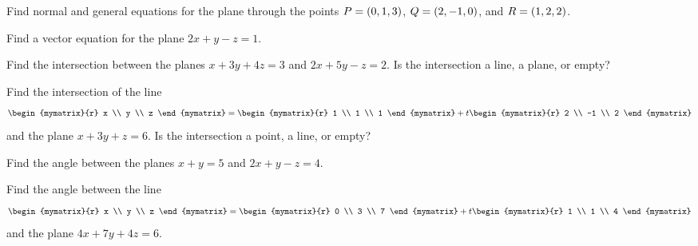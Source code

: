 \begin{enumialphparenastyle}
\begin{ex}
  Find normal and general equations for the plane through the points
  $P = \left(0,1,3\right)$, $Q=\left(2,-1,0\right)$, and $R=\left(1,2,2\right)$.
\end{ex}

\begin{ex}
  Find a vector equation for the plane $2x+y-z=1$.
\end{ex}

\begin{ex}
  Find the intersection between the planes $x+3y+4z=3$ and $2x+5y-z=2$.
  Is the intersection a line, a plane, or empty?
\end{ex}

\begin{ex}
Find the intersection of the line
  \begin{equation*}
    \begin{mymatrix}{r} x \\ y \\ z \end{mymatrix}
    = \begin{mymatrix}{r} 1 \\ 1 \\ 1 \end{mymatrix}
    + t \begin{mymatrix}{r} 2 \\ -1 \\ 2 \end{mymatrix}
  \end{equation*}
  and the plane $x+3y+z = 6$.
  Is the intersection a point, a line, or empty?
\end{ex}

\begin{ex}
  Find the angle between the planes $x+y=5$ and $2x+y-z=4$.
\end{ex}

\begin{ex}
  Find the angle between the line
  \begin{equation*}
    \begin{mymatrix}{r} x \\ y \\ z \end{mymatrix}
    = \begin{mymatrix}{r} 0 \\ 3 \\ 7 \end{mymatrix}
    + t \begin{mymatrix}{r} 1 \\ 1 \\ 4 \end{mymatrix}
  \end{equation*}
  and the plane $4x+7y+4z = 6$.
\end{ex}


\end{enumialphparenastyle}
